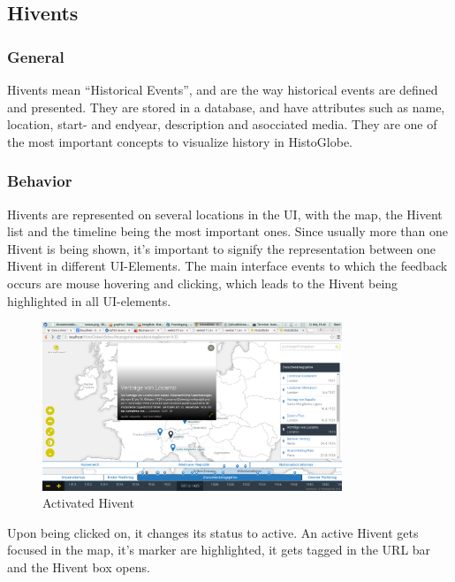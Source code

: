 \subsection{Hivents} %
\label{sec:hivents}

\subsubsection{General} %
\label{sub:general}
Hivents mean ``Historical Events'', and are the way historical events are defined and presented. They are stored in a database, and have attributes such as name, location, start- and endyear, description and asocciated media.
They are one of the most important concepts to visualize history in HistoGlobe.

\subsubsection{Behavior} %
\label{sub:behaviour}
Hivents are represented on several locations in the UI, with the map, the Hivent list and the timeline being the most important ones.
Since usually more than one Hivent is being shown, it's important to signify the representation between one Hivent in different UI-Elements.
The main interface events to which the feedback occurs are mouse hovering and clicking, which leads to the Hivent being highlighted in all UI-elements.

\begin{figure}[here]
  \begin{center}
    \includegraphics[width=0.8\textwidth]{graphics/activated_hivent.png}
  \end{center}
  \caption{Activated Hivent}
  \label{fig:activated_hivent}
\end{figure}

Upon being clicked on, it changes its status to active. An active Hivent gets focused in the map, it's marker are highlighted, it gets tagged in the URL bar and the Hivent box opens.

